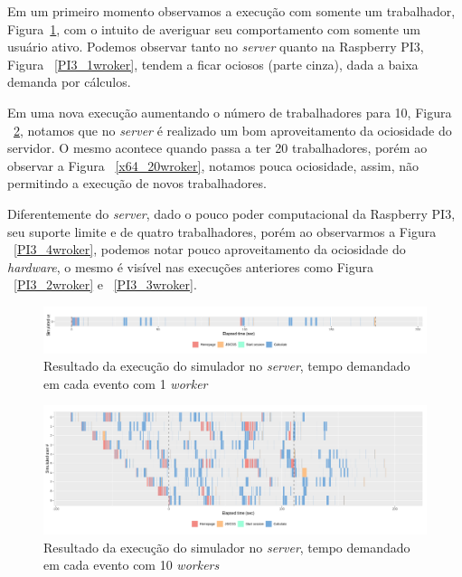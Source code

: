 \documentclass[12pt,english,brazil]{article}
\begin{document}
Em um primeiro momento observamos a execução com somente um trabalhador, Figura~\ref{x64_1wroker}, com o intuito de averiguar seu comportamento com somente um usuário ativo. Podemos observar tanto no \emph{server} quanto na Raspberry PI3, Figura ~\ref{PI3_1wroker}, tendem a ficar ociosos (parte cinza), dada a baixa demanda por cálculos. 

Em uma nova execução aumentando o número de trabalhadores para 10, Figura ~\ref{x64_10wroker}, notamos que no \emph{server} é realizado um bom aproveitamento da ociosidade do servidor. O mesmo acontece quando passa a ter 20 trabalhadores, porém ao observar a Figura ~\ref{x64_20wroker}, notamos pouca ociosidade, assim, não permitindo a execução de novos trabalhadores.

Diferentemente do \emph{server}, dado o pouco poder computacional da Raspberry PI3, seu suporte limite e de quatro trabalhadores, porém ao observarmos a Figura ~\ref{PI3_4wroker}, podemos notar pouco aproveitamento da ociosidade do \emph{hardware}, o mesmo é visível nas execuções anteriores como Figura ~\ref{PI3_2wroker} e ~\ref{PI3_3wroker}.



\begin{figure}[htbp]
  \centering 
  \includegraphics[scale=.4]{paperWSCAD2021/figures/user_x64_1_worker.png}
  \caption{Resultado da execução do simulador no \emph{server}, tempo demandado em cada evento com 1 \emph{worker}}
  \label{x64_1wroker}
\end{figure}

\begin{figure}[htbp]
  \centering 
  \includegraphics[scale=.4]{paperWSCAD2021/figures/user_x64_10_worker.png}
  \caption{Resultado da execução do simulador no \emph{server}, tempo demandado em cada evento com 10 \emph{workers}}
  \label{x64_10wroker}
\end{figure}
\end{document}
